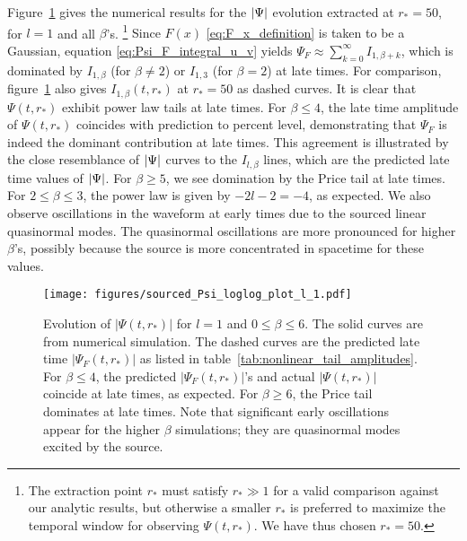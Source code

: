 \documentclass[reprint,aps,physrev,superscriptaddress,10pt,notitlepage,prd,nofootinbib,onecolumn]{revtex4-2}
\newcommand{\fref}[1]{figure~\ref{#1}}
\newcommand{\Fref}[1]{Figure~\ref{#1}}
\newcommand{\tref}[1]{table~\ref{#1}}
\newcommand{\Revise}[1]{{\color{red} #1}}
\begin{document}
\Fref{fig:sourced_Psi_loglog} gives the numerical results for the $\abs{\Psi}$ evolution extracted at $r_*=50$, for $l=1$ and all $\beta$'s.
\footnote{\Revise{The extraction point $r_*$ must satisfy $r_* \gg 1$ for a valid comparison against our analytic results, but otherwise a smaller $r_*$ is preferred to maximize the temporal window for observing $\Psi(t,r_*)$.  We have thus chosen $r_* = 50$. }}
\Revise{Since $F(x)$ \eqref{eq:F_x_definition} is taken to be a Gaussian, equation \eqref{eq:Psi_F_integral_u_v} yields $\Psi_F \approx \sum_{k=0}^{\infty} I_{1,\beta+k}$, which is dominated by $I_{1,\beta}$ (for $\beta \neq 2$) or $I_{1,3}$ (for $\beta = 2$) at late times. For comparison, \fref{fig:sourced_Psi_loglog} also gives $I_{1,\beta}(t,r_*)$ at $r_*=50$ as dashed curves.  }
It is clear that $\Psi(t,r_*)$ exhibit power law tails at late times.
For $\beta \leq 4$, the late time amplitude of $\Psi(t,r_*)$ coincides with prediction to percent level, demonstrating that $\Psi_F$ is indeed the dominant contribution at late times.
This agreement is illustrated by the close resemblance of $\abs{\Psi}$ curves to the $I_{l,\beta}$ lines, which are the predicted late time values of $\abs{\Psi}$.
For $\beta \geq 5$, we see domination by the Price tail at late times.
For $2 \leq \beta \leq 3$, the power law is given by $-2l-2 = -4$, as expected.
We also observe oscillations in the waveform at early times due to the sourced linear quasinormal modes.
The quasinormal oscillations are more pronounced for higher $\beta$'s, possibly because the source is more concentrated in spacetime for these values.
\begin{figure}[t]
  \centering \texttt{[image: figures/sourced\_Psi\_loglog\_plot\_l\_1.pdf]}
  \caption{Evolution of $|\Psi(t,r_*)|$ for $l=1$ and $0 \leq \beta \leq 6$.
    The solid curves are from numerical simulation.
    The dashed curves are the predicted late time $|\Psi_F(t,r_*)|$ as listed in \tref{tab:nonlinear_tail_amplitudes}.
    For $\beta \leq 4$, the predicted $|\Psi_F(t,r_*)|$'s and actual $|\Psi(t,r_*)|$ coincide at late times, as expected.
    For $\beta \geq 6$, the Price tail dominates at late times.
    Note that significant early oscillations appear for the higher $\beta$ simulations; they are quasinormal modes excited by the source.}
  \label{fig:sourced_Psi_loglog}
\end{figure}
\end{document}
